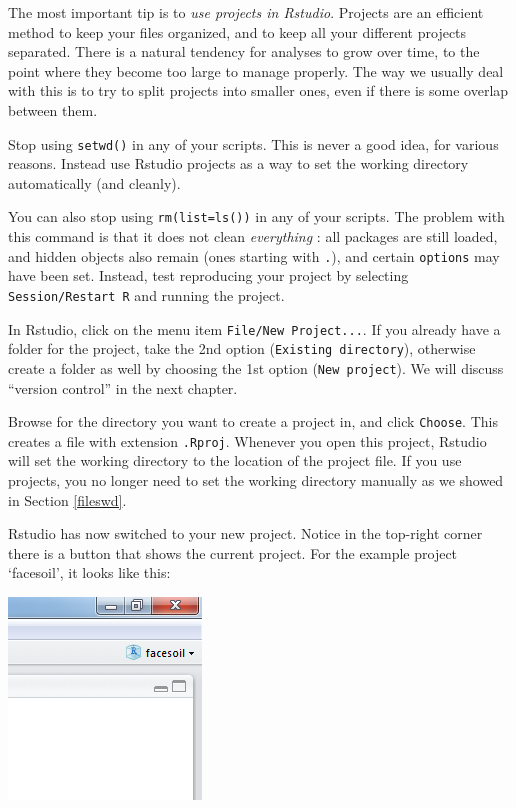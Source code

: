 \documentclass[]{book}
\let\BeginKnitrBlock\begin \let\EndKnitrBlock\end
\begin{document}
The most important tip is to \emph{use projects in Rstudio}. Projects are an efficient method to keep your files organized, and to keep all your different projects separated. There is a natural tendency for analyses to grow over time, to the point where they become too large to manage properly. The way we usually deal with this is to try to split projects into smaller ones, even if there is some overlap between them.

\BeginKnitrBlock{rmdcaution}
Stop using \texttt{setwd()} in any of your scripts. This is never a good idea, for various reasons. Instead use Rstudio projects as a way to set the working directory automatically (and cleanly).

You can also stop using \texttt{rm(list=ls())} in any of your scripts. The problem with this command is that it does not clean \emph{everything} : all packages are still loaded, and hidden objects also remain (ones starting with \texttt{.}), and certain \texttt{options} may have been set. Instead, test reproducing your project by selecting \texttt{Session/Restart\ R} and running the project.
\EndKnitrBlock{rmdcaution}

In Rstudio, click on the menu item \texttt{File/New\ Project...}. If you already have a folder for the project, take the 2nd option (\texttt{Existing\ directory}), otherwise create a folder as well by choosing the 1st option (\texttt{New\ project}). We will discuss ``version control'' in the next chapter.

Browse for the directory you want to create a project in, and click \texttt{Choose}. This creates a file with extension \texttt{.Rproj}. Whenever you open this project, Rstudio will set the working directory to the location of the project file. If you use projects, you no longer need to set the working directory manually as we showed in Section \ref{fileswd}.

Rstudio has now switched to your new project. Notice in the top-right corner there is a button that shows the current project. For the example project `facesoil', it looks like this:

\includegraphics[width=0.3\linewidth]{screenshots/projectbutton}
\end{document}
